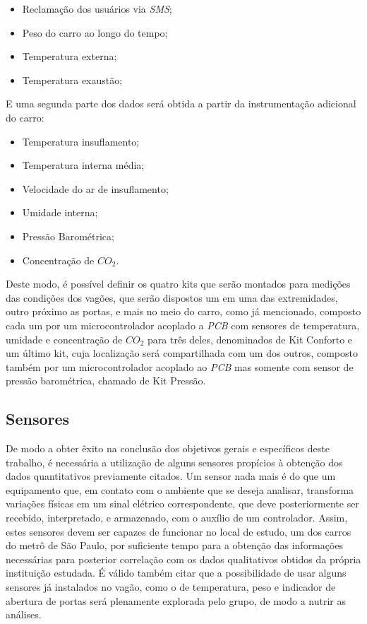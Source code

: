 \documentclass[acronym,symbols,table]{fei}
\begin{document}
\begin{itemize}
    \item Reclamação dos usuários via \textit{SMS};
    \item Peso do carro ao longo do tempo;
    \item Temperatura externa;
    \item Temperatura exaustão;
\end{itemize}    

E uma segunda parte dos dados será obtida a partir da instrumentação adicional do carro:

\begin{itemize}
    \item Temperatura insuflamento;
    \item Temperatura interna média;   
    \item Velocidade do ar de insuflamento;
    \item Umidade interna; 
    \item Pressão Barométrica;
    \item Concentração de $CO_2$. 
\end{itemize}    

Deste modo, é possível definir os quatro kits que serão montados para medições das condições dos vagões, que serão dispostos um em uma das extremidades, outro próximo as portas, e mais no meio do carro, como já mencionado, composto cada um por um microcontrolador acoplado a \textit{PCB} com sensores de temperatura, umidade e concentração de $CO_2$ para três deles, denominados de Kit Conforto e um último kit, cuja localização será compartilhada com um dos outros, composto também por um microcontrolador acoplado ao \textit{PCB} mas somente com sensor de pressão barométrica, chamado de Kit Pressão.

\subsection{Sensores} \label{sensor}

De modo a obter êxito na conclusão dos objetivos gerais e específicos deste trabalho, é necessária a utilização de alguns sensores propícios à obtenção dos dados quantitativos previamente citados. Um sensor nada mais é do que um equipamento que, em contato com o ambiente que se deseja analisar, transforma variações físicas em um sinal elétrico correspondente, que deve posteriormente ser recebido, interpretado, e armazenado, com o auxílio de um controlador. Assim, estes sensores devem ser capazes de funcionar no local de estudo, um dos carros do metrô de São Paulo, por suficiente tempo para a obtenção das informações necessárias para posterior correlação com os dados qualitativos obtidos da própria instituição estudada. É válido também citar que a possibilidade de usar alguns sensores já instalados no vagão, como o de temperatura, peso e indicador de abertura de portas será plenamente explorada pelo grupo, de modo a nutrir as análises.
\end{document}
